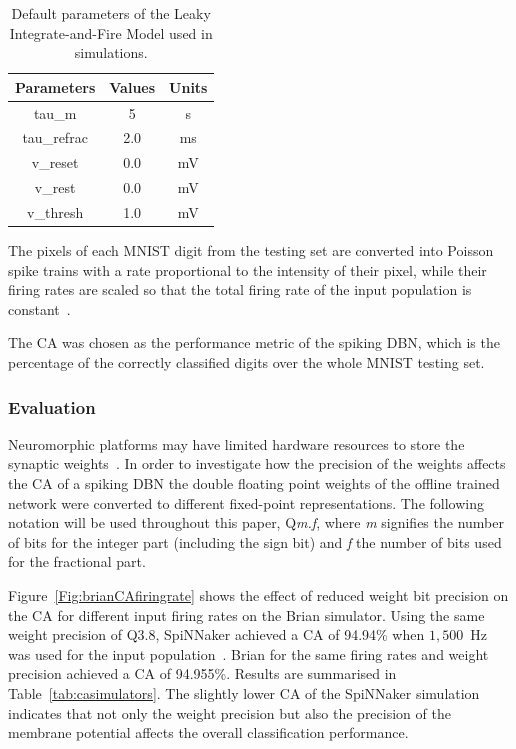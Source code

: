 \documentclass{frontiersENG} %
\begin{document}
\begin{table}[hbbp]
	\centering
	\caption{\label{Tab:NeuralParams}Default parameters of the Leaky Integrate-and-Fire Model used in simulations.}
	\bgroup
	\def\arraystretch{1.1}
	\begin{tabular}{c|c|c}
		Parameters & Values & Units \\
		\hline
		tau\_m & 5 & s\\
		tau\_refrac & 2.0 & ms\\
		v\_reset & 0.0 & mV\\
		v\_rest & 0.0 & mV\\
		v\_thresh & 1.0 & mV\\
	\end{tabular}
	\egroup
\end{table}

The pixels of each MNIST digit from the testing set are converted into Poisson spike trains with a rate proportional to the intensity of their pixel, while their firing rates are scaled so that the total firing rate of the input population is constant~\citep{o2013real}.

The CA was chosen as the performance metric of the spiking DBN, which is the percentage of the correctly classified digits over the whole MNIST testing set.

\subsubsection{Evaluation}
Neuromorphic platforms may have limited hardware resources to store the synaptic weights~\citep{schemmel2010wafer,merolla2014million}. In order to investigate how the precision of the weights affects the CA of a spiking DBN the double floating point weights of the offline trained network were converted to different fixed-point representations. The following notation will be used throughout this paper, Q\textit{m.f}, where \textit{m} signifies the number of bits for the integer part (including the sign bit) and \textit{f} the number of bits used for the fractional part.

Figure~\ref{Fig:brianCAfiringrate} shows the effect of reduced weight bit precision on the CA for different input firing rates on the Brian simulator.
Using the same weight precision of Q3.8, SpiNNaker achieved a CA of 94.94\% when $1,500$~Hz was used for the input population~\citep{Stromatias2015scalable}. Brian for the same firing rates and weight precision achieved a CA of 94.955\%. Results are summarised in Table~\ref{tab:casimulators}.
The slightly lower CA of the SpiNNaker simulation indicates that not only the weight precision but also the precision of the membrane potential affects the overall classification performance.    
\end{document}
